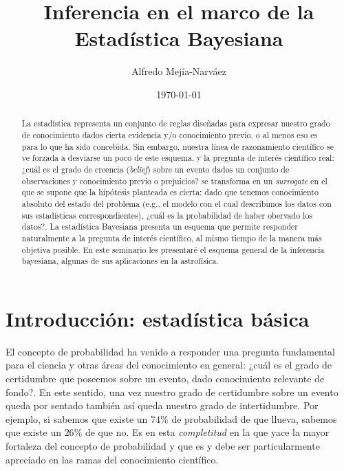 \documentclass[a4paper,twoside]{article}
\title{Inferencia en el marco de la Estadística Bayesiana}
\author{Alfredo Mejía-Narváez}
\date{\today}
\begin{document}
\maketitle

\begin{abstract}
%
La estadística representa un conjunto de reglas diseñadas para expresar nuestro grado de
conocimiento dados cierta evidencia y/o conocimiento previo, o al menos eso es para lo que ha sido
concebida. Sin embargo, nuestra línea de razonamiento científico se ve forzada a desviarse un poco
de este esquema, y la pregunta de interés científico real: ¿cuál es el grado de creencia
(\emph{belief}) sobre un evento dados un conjunto de observaciones y conocimiento previo o
prejuicios? se transforma en un \emph{surrogate} en el que se supone que la hipótesis planteada es
cierta: dado que tenemos conocimiento absoluto del estado del problema (e.g., el modelo con el cual
describimos los datos con sus estadísticas correspondientes), ¿cuál es la probabilidad de haber
obervado los datos?. La estadística Bayesiana presenta un esquema que permite responder naturalmente
a la pregunta de interés científico, al mismo tiempo de la manera más objetiva posible. En este
seminario les presentaré el esquema general de la inferencia bayesiana, algunas de sus aplicaciones
en la astrofísica.
%
\end{abstract}


\section{Introducción: estadística básica}

El concepto de probabilidad ha venido a responder una pregunta fundamental para el ciencia y otras
áreas del conocimiento en general: ¿cuál es el grado de certidumbre que poseemos sobre un evento,
dado conocimiento relevante de fondo?. En este sentido, una vez nuestro grado de certidumbre sobre
un evento queda por sentado también así queda nuestro grado de intertidumbre. Por ejemplo, si
sabemos que existe un $74\%$ de probabilidad de que llueva, sabemos que existe un $26\%$ de que no.
Es en esta \emph{completitud} en la que yace la mayor fortaleza del concepto de probabilidad y que
es y debe ser particularmente apreciado en las ramas del conocimiento científico.
\end{document}
